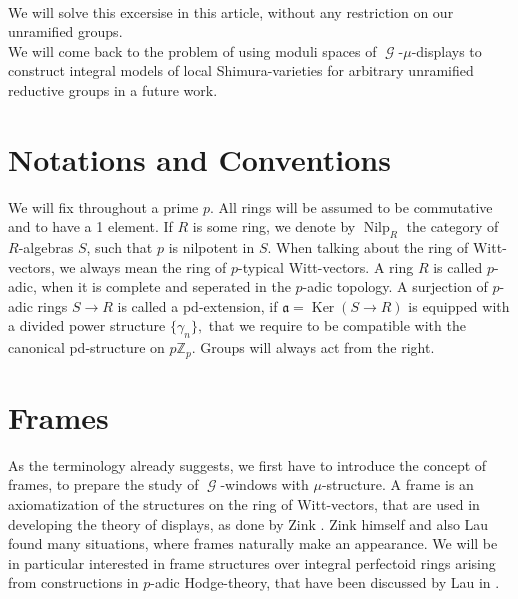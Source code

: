 \documentclass[a4paper,10,5 pt]{amsart}
\theoremstyle{definition}
\DeclareMathOperator{\Nilp}{Nilp}
\DeclareMathOperator{\Ker}{Ker}
\DeclareMathOperator{\G}{\mathcal{G}}
\begin{document}
\\
We will solve this excersise in this article, without any restriction on our unramified groups.
\\
We will come back to the problem of using moduli spaces of $\G$-$\mu$-displays to construct integral models of local Shimura-varieties for arbitrary unramified reductive groups in a future work.

\section{Notations and Conventions}
We will fix throughout a prime $p$. All rings will be assumed to be commutative and to have a 1 element. If $R$ is some ring, we denote by $\Nilp_{R}$ the category of $R$-algebras $S$, such that $p$ is nilpotent in $S$. When talking about the ring of Witt-vectors, we always mean the ring of $p$-typical Witt-vectors.
A ring $R$ is called $p$-adic, when it is complete and seperated in the $p$-adic topology. A surjection of $p$-adic rings $S\rightarrow R$ is called a pd-extension, if $\mathfrak{a}=\Ker(S\rightarrow R)$ is equipped with a divided power structure $\lbrace \gamma_{n} \rbrace,$ that we require to be compatible with the canonical pd-structure on $p\mathbb{Z}_{p}$.  Groups will always act from the right.
\section{Frames}
As the terminology already suggests, we first have to introduce the concept of frames, to prepare the study of $\G$-windows with $\mu$-structure. A frame is an axiomatization of the structures on the ring of Witt-vectors, that are used in developing the theory of displays, as done by Zink \cite{zink-displays}. Zink himself and also Lau found many situations, where frames naturally make an appearance. We will be in particular interested in frame structures over integral perfectoid rings arising from constructions in $p$-adic Hodge-theory, that have been discussed by Lau in \cite{Lau perfektoid}.
\\
\end{document}
